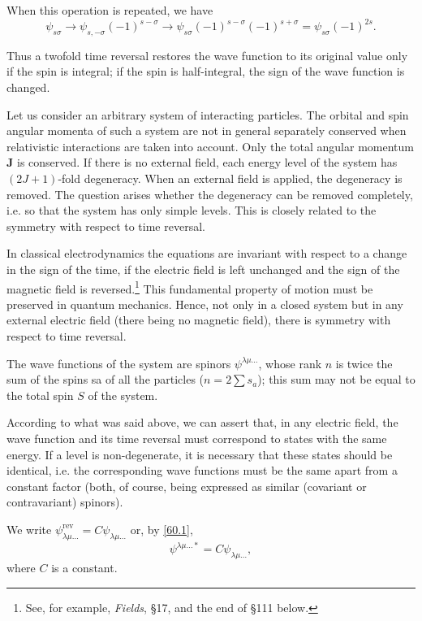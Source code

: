 When this operation is repeated, we have
\[\psi_{s\sigma}\to\psi_{s,-\sigma}(-1)^{s-\sigma}\to\psi_{s\sigma}(-1)^{s-\sigma}(-1)^{s+\sigma}=\psi_{s\sigma}(-1)^{2s}. \]



Thus a twofold time reversal restores the wave function to its original value only if the spin is integral; if the spin is half-integral, the sign of the wave function is changed.

Let us consider an arbitrary system of interacting particles. The orbital and spin angular momenta of such a system are not in general separately conserved when relativistic interactions are taken into account. Only the total angular momentum $ \bm{J} $ is conserved. If there is no external field, each energy level of the system has $ (2J + 1) $-fold degeneracy. When an external field is applied, the degeneracy is removed. The question arises whether the degeneracy can be removed completely, i.e. so that the system has only simple levels. This is closely related to the symmetry with respect to time reversal.

In classical electrodynamics the equations are invariant with respect to a change in the sign of the time, if the electric field is left unchanged and the sign of the magnetic field is reversed.\footnote{See, for example, \textit{Fields}, \S17, and the end of \S111 below.} This fundamental property of motion must be preserved in quantum mechanics. Hence, not only in a closed system but in any external electric field (there being no magnetic field), there is symmetry with respect to time reversal.

The wave functions of the system are spinors $ \psi^{\lambda\mu\dots} $, whose rank $ n $ is twice the sum of the spins sa of all the particles ($ n = 2 \sum s_a $); this sum may not be equal to the total spin $ S $ of the system.

According to what was said above, we can assert that, in any electric field, the wave function and its time reversal must correspond to states with the same energy. If a level is non-degenerate, it is necessary that these states should be identical, i.e. the corresponding wave functions must be the same apart from a constant factor (both, of course, being expressed as similar (covariant or contravariant) spinors).

We write $ \psi^{\mathrm{rev}}_{\lambda\mu\dots}=C\psi_{\lambda\mu\dots} $ or, by \eqref{60.1},
\begin{equation}\label{60.4}
\psi^{\lambda\mu\dots*}=C\psi_{\lambda\mu\dots},
\end{equation}
where $ C $ is a constant.

